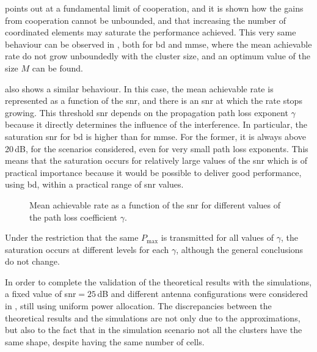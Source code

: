 \cite{lozano13} points out at a fundamental limit of cooperation, and it is
shown how the gains from cooperation cannot be unbounded, and that increasing
the number of coordinated elements may saturate the performance achieved. This
very same behaviour can be observed in , both for
\gls{bd} and \gls{mmse}, where the mean achievable rate do not grow unboundedly
with the cluster size, and an optimum value of the size $M$ can be found.

 also shows a similar behaviour. In this case, the
mean achievable rate is represented as a function of the \gls{snr}, and there is
an \gls{snr} at which the rate stops growing. This threshold \gls{snr} depends
on the propagation path loss exponent $\gamma$ because it directly determines
the influence of the interference. In particular, the saturation \gls{snr} for
\gls{bd} is higher than for \gls{mmse}. For the former, it is always above
20\,dB, for the scenarios considered, even for very small path loss exponents.
This means that the saturation occurs for relatively large values of the
\gls{snr} which is of practical importance because it would be possible to
deliver good performance, using \gls{bd}, within a practical range of \gls{snr}
values.

\begin{figure}[t]
\begin{center}
    \hspace*{-2mm}
\end{center}
\caption{Mean achievable rate as a function of the \gls{snr} for different
values of the path loss coefficient $\gamma$.}
\label{fig:rate_vs_snr_gamma}
\end{figure}

Under the restriction that the same $P_{\max}$ is transmitted for all values of
$\gamma$, the saturation occurs at different levels for each $\gamma$, although
the general conclusions do not change.

In order to complete the validation of the theoretical results with the
simulations, a fixed value of \gls{snr}$=25$\,dB and different antenna
configurations were considered in , still using
uniform power allocation. The discrepancies between the theoretical results and
the simulations are not only due to the approximations, but also to the fact
that in the simulation scenario not all the clusters have the same shape,
despite having the same number of cells.

